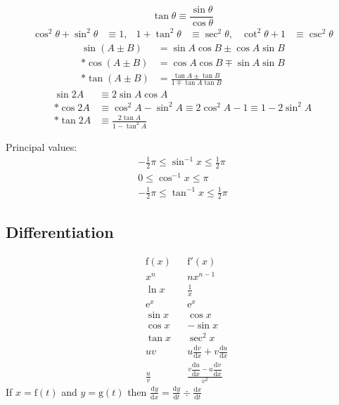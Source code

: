 \documentclass[../"Formula sheet.tex"]{subfiles}
\begin{document}
\begin{equation}
    \tan{\theta} \equiv \frac{\sin{\theta}}{\cos{\theta}}
\end{equation}
\begin{align}
    \cos^2{\theta} + \sin^2{\theta} &\equiv 1,  &  1+\tan^2{\theta} &\equiv \sec^2{\theta},  &  \cot^2{\theta}+1 &\equiv \csc^2{\theta}
\end{align}
\begin{align}
    \sin{(A \pm B)} &= \sin A \cos B \pm \cos A \sin B \\*
    \cos{(A \pm B)} &= \cos A \cos B \mp \sin A \sin B \\*
    \tan{(A \pm B)} &= \frac{\tan A \pm \tan B}{1 \mp \tan A \tan B}
\end{align}
\begin{align}
    \sin{2A} &\equiv 2\sin A \cos A \\*
    \cos{2A} &\equiv \cos^2{A} - \sin^2{A} \equiv 2 \cos^2{A}-1 \equiv 1-2\sin^2{A} \\*
    \tan{2A} &\equiv \frac{2 \tan A}{1 - \tan^2{A}}
\end{align}

Principal values:
\begin{gather}
    -\frac{1}{2} \pi \leq \sin^{-1}{x} \leq \frac{1}{2} \pi \\
    0 \leq \cos^{-1}{x} \leq \pi \\
    -\frac{1}{2} \pi \leq \tan^{-1}{x} \leq \frac{1}{2} \pi
\end{gather}

\subsection{Differentiation}
\begin{align}
    &\mathrm{f}(x)  &  &\mathrm{f}'(x) \nonumber \\
    &x^n            &  &nx^{n-1} \\
    &\ln{x}         &  &\frac{1}{x} \\
    &\mathrm{e}^x   &  &\mathrm{e}^x \\
    &\sin x         &  &\cos x \\
    &\cos x         &  &-\sin x \\
    &\tan x         &  &\sec^2 x \\
    &uv             &  &{ u\frac{\mathrm{d}v}{\mathrm{d}x}+v\frac{\mathrm{d}u}{\mathrm{d}x}} \\
    &\frac{u}{v}    &  &\frac{v\dfrac{\mathrm{d}u}{\mathrm{d}x}-u\dfrac{\mathrm{d}v}{\mathrm{d}x}}{v^2}
\end{align}
If \(x = \mathrm{f}(t)\) and \(y = \mathrm{g}(t)\) then \(\frac{\mathrm{d}y}{\mathrm{d}x} = \frac{\mathrm{d}y}{\mathrm{d}t} \div \frac{\mathrm{d}x}{\mathrm{d}t}\)
\end{document}
